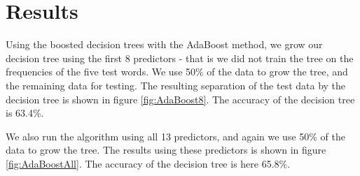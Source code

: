 \documentclass[a4paper,11pt]{article}
\begin{document}
\section{Results}
\FloatBarrier
\noindent Using the boosted decision trees with the AdaBoost method, we grow our decision tree using the first 8 predictors - that is we did not train the tree on the frequencies of the five test words. We use 50\% of the data to grow the tree, and the remaining data for testing. The resulting separation of the test data by the decision tree is shown in figure \ref{fig:AdaBoost8}. The accuracy of the decision tree is 63.4\%.

\noindent We also run the algorithm using all 13 predictors, and again we use 50\% of the data to grow the tree. The results using these predictors is shown in figure \ref{fig:AdaBoostAll}. The accuracy of the decision tree is here 65.8\%.
\end{document}
